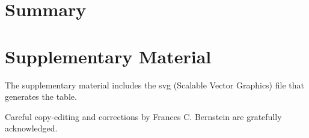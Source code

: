\documentclass[preprint]{iucr}              %
\numberwithin{equation}{section}
\newcommand{\SVI}[0]{$\bf{S^{6}}$}
\begin{document}
	


	
	\section{Summary}
	
\section{Supplementary Material}

The supplementary material includes the 
svg (Scalable Vector Graphics) file that generates the table.
	
	
	
	
	
	Careful copy-editing and corrections by Frances C. Bernstein are 
	gratefully acknowledged.

	
	
\end{document}
